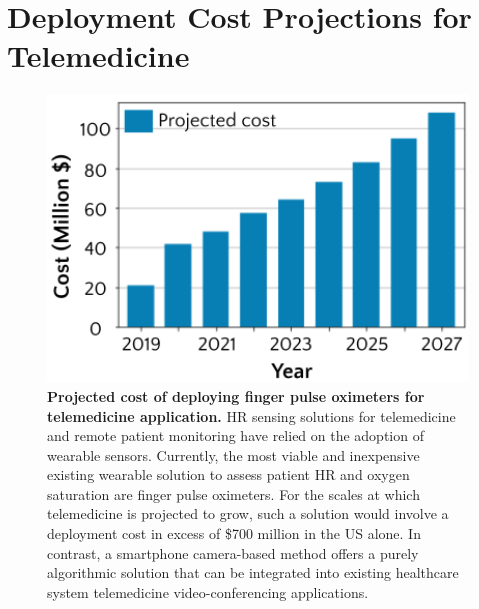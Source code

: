 %
%

\chapter{Deployment Cost Projections for Telemedicine}
\label{chap:telemedicine_cost_projections}

\begin{figure}
    \centering
    \includegraphics[height=3in]{include/project_costs_fig.png}
    \caption{\textbf{Projected cost of deploying finger pulse oximeters for telemedicine application.} HR sensing solutions for telemedicine and remote patient monitoring have relied on the adoption of wearable sensors. Currently, the most viable and inexpensive existing wearable solution to assess patient HR and oxygen saturation are finger pulse oximeters. For the scales at which telemedicine is projected to grow, such a solution would involve a deployment cost in excess of \$700 million in the US alone. In contrast, a smartphone camera-based method offers a purely algorithmic solution that can be integrated into existing healthcare system telemedicine video-conferencing applications.}
    \label{fig:projected_costs_pulseox}
\end{figure}

